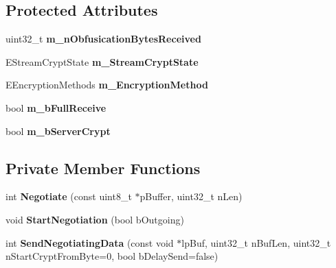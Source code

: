 \subsection*{Protected Attributes}
\begin{DoxyCompactItemize}
\item 
uint32\_\-t {\bfseries m\_\-nObfusicationBytesReceived}\label{classCEncryptedStreamSocket_a3baa8ac3308fa6cce554b18b55289ccf}

\item 
EStreamCryptState {\bfseries m\_\-StreamCryptState}\label{classCEncryptedStreamSocket_a41e2e94edcdbff4f51aed0f15e686d39}

\item 
EEncryptionMethods {\bfseries m\_\-EncryptionMethod}\label{classCEncryptedStreamSocket_a2923bf978640a5224d695b0ff5384ba2}

\item 
bool {\bfseries m\_\-bFullReceive}\label{classCEncryptedStreamSocket_ab01e1a22496de1dab1936410a9c799c8}

\item 
bool {\bfseries m\_\-bServerCrypt}\label{classCEncryptedStreamSocket_a4f0def0592f066212929e81ee3359ba4}

\end{DoxyCompactItemize}
\subsection*{Private Member Functions}
\begin{DoxyCompactItemize}
\item 
int {\bfseries Negotiate} (const uint8\_\-t $\ast$pBuffer, uint32\_\-t nLen)\label{classCEncryptedStreamSocket_a339e8b613784be05f2adfa5d68ddb216}

\item 
void {\bfseries StartNegotiation} (bool bOutgoing)\label{classCEncryptedStreamSocket_afb9887a93df6053bae5c838e4746dab7}

\item 
int {\bfseries SendNegotiatingData} (const void $\ast$lpBuf, uint32\_\-t nBufLen, uint32\_\-t nStartCryptFromByte=0, bool bDelaySend=false)\label{classCEncryptedStreamSocket_a2191fb0e862afe741a06b5e78406fc13}

\end{DoxyCompactItemize}
